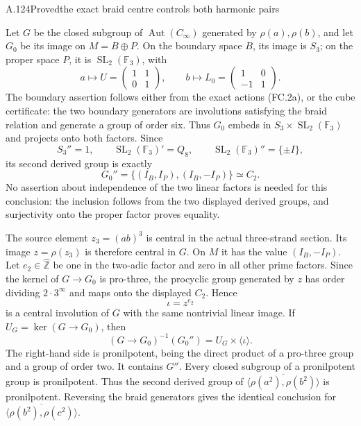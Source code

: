 \begin{statement}{A.124}{Proved}{the exact braid centre controls both harmonic pairs}
\end{statement}
Let $G$ be the closed subgroup of $\operatorname{Aut}(C_\infty)$
generated by $\rho(a),\rho(b)$, and let $G_0$ be its image
on $M=B\oplus P$. On the boundary space $B$, its image
is $S_3$; on the proper space $P$, it is
$\operatorname{SL}_2(\mathbb F_3)$, with
\[
 a\longmapsto U=\begin{pmatrix}1&1\\0&1\end{pmatrix},
 \qquad
 b\longmapsto L_0=\begin{pmatrix}1&0\\-1&1\end{pmatrix}.
 \tag{FR.2a}
\]
The boundary assertion follows either from the exact actions
(FC.2a), or the cube certificate: the two boundary generators
are involutions satisfying the braid relation and generate
a group of order six. Thus $G_0$ embeds in
$S_3\times\operatorname{SL}_2(\mathbb F_3)$ and projects
onto both factors. Since
\[
 S_3''=1,\qquad
 \operatorname{SL}_2(\mathbb F_3)'=Q_8,\qquad
 \operatorname{SL}_2(\mathbb F_3)''=\{\pm I\},
\]
its second derived group is exactly
\[
              G_0''=\{(I_B,I_P),(I_B,-I_P)\}\simeq C_2.
 \tag{FR.2b}
\]
No assertion about independence of the two linear factors is
needed for this conclusion: the inclusion follows from the
two displayed derived groups, and surjectivity onto the proper
factor proves equality.

The source element $z_3=(ab)^3$ is central in the actual
three-strand section. Its image $z=\rho(z_3)$ is therefore
central in $G$. On $M$ it has the value $(I_B,-I_P)$.
Let $e_2\in\widehat{\mathbb Z}$ be one in the two-adic
factor and zero in all other prime factors. Since the kernel
of $G\to G_0$ is pro-three, the procyclic group generated
by $z$ has order dividing $2\cdot3^\infty$ and maps onto
the displayed $C_2$. Hence
\[
                         \iota=z^{e_2}
\]
is a central involution of $G$ with the same nontrivial
linear image. If $U_G=\ker(G\to G_0)$, then
\[
  (G\longrightarrow G_0)^{-1}(G_0'')
                 =U_G\times\langle\iota\rangle.
 \tag{FR.2c}
\]
The right-hand side is pronilpotent, being the direct product
of a pro-three group and a group of order two. It contains
$G''$. Every closed subgroup of a pronilpotent group is
pronilpotent. Thus the second derived group of
$\overline{\langle\rho(a^2),\rho(b^2)\rangle}$ is
pronilpotent. Reversing the braid generators gives the identical
conclusion for
$\overline{\langle\rho(b^2),\rho(c^2)\rangle}$.

